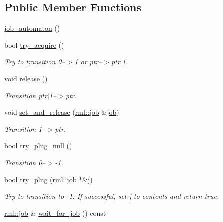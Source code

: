 \subsection*{Public Member Functions}
\begin{DoxyCompactItemize}
\item 
\hyperlink{classrml_1_1internal_1_1job__automaton_a718f6b9c70693c1acd2505a09fe70573}{job\+\_\+automaton} ()
\item 
bool \hyperlink{classrml_1_1internal_1_1job__automaton_a7827846c262b57f3675d9daa26a99f5c}{try\+\_\+acquire} ()
\begin{DoxyCompactList}\small\item\em Try to transition 0--$>$1 or ptr--$>$ptr$\vert$1. \end{DoxyCompactList}\item 
void \hyperlink{classrml_1_1internal_1_1job__automaton_a4ff55249f0b1e04a734544d1dacaa981}{release} ()
\begin{DoxyCompactList}\small\item\em Transition ptr$\vert$1--$>$ptr. \end{DoxyCompactList}\item 
void \hyperlink{classrml_1_1internal_1_1job__automaton_a7f664e7ea0f14a8313c297847c53351a}{set\+\_\+and\+\_\+release} (\hyperlink{classrml_1_1job}{rml\+::job} \&\hyperlink{classrml_1_1job}{job})
\begin{DoxyCompactList}\small\item\em Transition 1--$>$ptr. \end{DoxyCompactList}\item 
bool \hyperlink{classrml_1_1internal_1_1job__automaton_aa02562dab9cd5c9fea74de1230954a52}{try\+\_\+plug\+\_\+null} ()
\begin{DoxyCompactList}\small\item\em Transition 0--$>$-\/1. \end{DoxyCompactList}\item 
bool \hyperlink{classrml_1_1internal_1_1job__automaton_aecec366a488ff3144fa9be54fc2cce94}{try\+\_\+plug} (\hyperlink{classrml_1_1job}{rml\+::job} $\ast$\&j)
\begin{DoxyCompactList}\small\item\em Try to transition to -\/1. If successful, set j to contents and return true. \end{DoxyCompactList}\item 
\hyperlink{classrml_1_1job}{rml\+::job} \& \hyperlink{classrml_1_1internal_1_1job__automaton_a4790e793e9acc1c1dac344e1c660f848}{wait\+\_\+for\+\_\+job} () const 
\end{DoxyCompactItemize}


